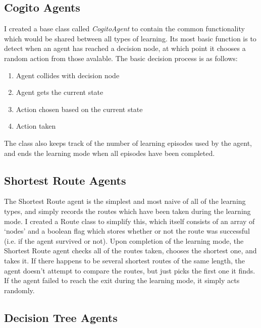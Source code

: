 \documentclass[a4paper,oneside]{report}
\begin{document}
\subsection{Cogito Agents}

I created a base class called \emph{CogitoAgent} to contain the common functionality which would be shared between all types of learning. Its most basic function is to detect when an agent has reached a decision node, at which point it chooses a random action from those avalable. The basic decision process is as follows:

\begin{enumerate}
	\item Agent collides with decision node
	\item Agent gets the current state
	\item Action chosen based on the current state
	\item Action taken
\end{enumerate}

The class also keeps track of the number of learning episodes used by the agent, and ends the learning mode when all episodes have been completed.

\subsection{Shortest Route Agents}

The Shortest Route agent is the simplest and most naive of all of the learning types, and simply records the routes which have been taken during the learning mode. I created a Route class to simplify this, which itself consists of an array of `nodes' and a boolean flag which stores whether or not the route was successful (i.e. if the agent survived or not). Upon completion of the learning mode, the Shortest Route agent checks all of the routes taken, chooses the shortest one, and takes it. If there happens to be several shortest routes of the same length, the agent doesn't attempt to compare the routes, but just picks the first one it finds. If the agent failed to reach the exit during the learning mode, it simply acts randomly.

\subsection{Decision Tree Agents}
\end{document}
